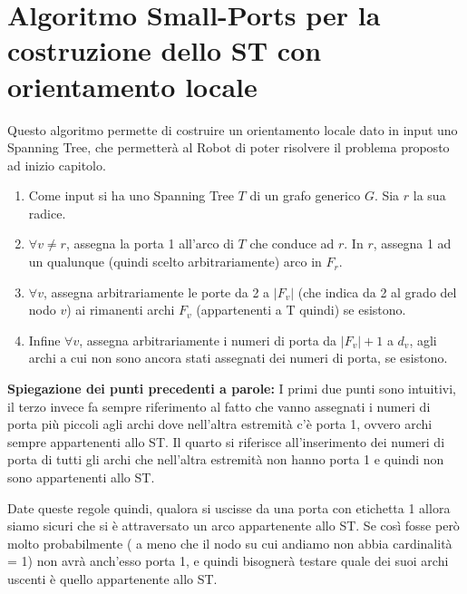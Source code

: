 \section{Algoritmo Small-Ports per la costruzione dello ST con orientamento locale}
Questo algoritmo permette di costruire un orientamento locale dato in input uno Spanning Tree, che permetterà al Robot di poter risolvere il problema proposto ad inizio capitolo.
\begin{enumerate}
 \item Come input si ha uno Spanning Tree $T$ di un grafo generico $G$. Sia $r$ la sua radice.

 \item $\forall v \neq r$, assegna la porta 1 all'arco di $T$ che conduce ad $r$. In $r$, assegna 1 ad un qualunque (quindi scelto arbitrariamente) arco in $F_r$.
 \item $\forall v$, assegna arbitrariamente le porte da 2 a $|F_v|$ (che indica da 2 al grado del nodo $v$) ai rimanenti archi $F_v$ (appartenenti a T quindi) se esistono.
 \item Infine $\forall v$, assegna arbitrariamente i numeri di porta da  $|F_v|+1$ a $d_v$, agli archi a cui non sono ancora stati assegnati dei numeri di porta, se esistono.%
\end{enumerate}
\textbf{Spiegazione dei punti precedenti a parole:} I primi due punti sono intuitivi, il terzo invece fa sempre riferimento al fatto che vanno assegnati i numeri di porta più piccoli agli archi dove nell'altra estremità c'è porta 1, ovvero archi sempre appartenenti allo ST. Il quarto si riferisce all'inserimento dei numeri di porta di tutti gli archi che nell'altra estremità non hanno porta 1 e quindi non sono appartenenti allo ST.

Date queste regole quindi, qualora si uscisse da una porta con etichetta 1 allora siamo sicuri che si è attraversato un arco appartenente allo ST. Se così fosse però molto probabilmente ( a meno che il nodo su cui andiamo non abbia cardinalità = 1) non avrà anch'esso porta 1, e quindi bisognerà testare quale dei suoi archi uscenti è quello appartenente allo ST.


